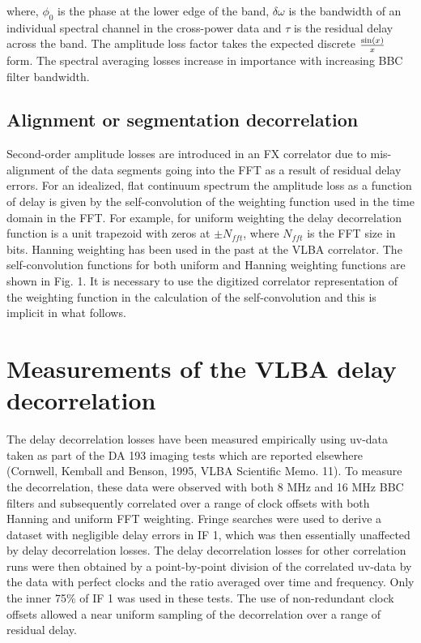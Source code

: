 where, $\phi_0$ is the phase at the lower edge of the band, $\delta
\omega$ is the bandwidth of an individual spectral channel in the
cross-power data and $\tau$ is the residual delay across the band. The
amplitude loss factor takes the expected discrete
${{\sin(x)}\over{x}}$ form. The spectral averaging losses increase in
importance with increasing BBC filter bandwidth.

\subsection{Alignment or segmentation decorrelation}

Second-order amplitude losses are introduced in an FX correlator due
to mis-alignment of the data segments going into the FFT as a result
of residual delay errors. For an idealized, flat continuum spectrum
the amplitude loss as a function of delay is given by the
self-convolution of the weighting function used in the time domain in
the FFT. For example, for uniform weighting the delay decorrelation
function is a unit trapezoid with zeros at $\pm N_{fft}$, where
$N_{fft}$ is the FFT size in bits. Hanning weighting has been used in
the past at the VLBA correlator. The self-convolution functions for
both uniform and Hanning weighting functions are shown in Fig. 1.  It
is necessary to use the digitized correlator representation of the
weighting function in the calculation of the self-convolution and this
is implicit in what follows.

\section{Measurements of the VLBA delay decorrelation}

The delay decorrelation losses have been measured empirically using
uv-data taken as part of the DA 193 imaging tests which are reported
elsewhere (Cornwell, Kemball and Benson, 1995, VLBA Scientific
Memo. 11).  To measure the decorrelation, these data were observed
with both 8 MHz and 16 MHz BBC filters and subsequently correlated
over a range of clock offsets with both Hanning and uniform FFT
weighting. Fringe searches were used to derive a dataset with
negligible delay errors in IF 1, which was then essentially unaffected
by delay decorrelation losses. The delay decorrelation losses for
other correlation runs were then obtained by a point-by-point division
of the correlated uv-data by the data with perfect clocks and the
ratio averaged over time and frequency. Only the inner 75$\%$ of IF 1
was used in these tests. The use of non-redundant clock offsets
allowed a near uniform sampling of the decorrelation over a range of
residual delay.

